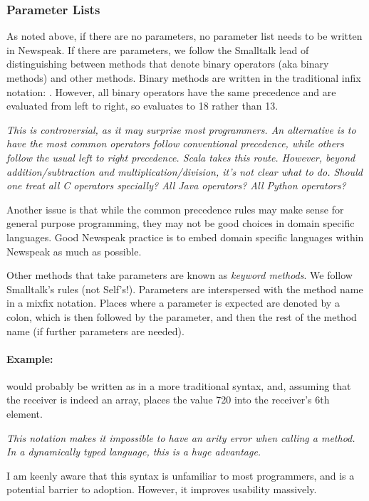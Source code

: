 \documentclass{article}
\begin{document}
\subsubsection{Parameter Lists}

As noted above, if there are no parameters, no parameter list needs to be written in Newspeak. If there are parameters, we follow the Smalltalk lead of distinguishing between methods that denote binary operators (aka binary methods) and other methods. Binary methods are written in the traditional infix notation: .  However, all binary operators have the same precedence and are evaluated from left to right, so  evaluates to 18 rather than 13. 

{\em This is controversial, as it may surprise most programmers. An alternative is to have the most common operators follow conventional precedence, while others follow the usual left to right precedence. Scala \cite{ScalaBook} takes this route. However, beyond addition/subtraction and multiplication/division, it's not clear what to do. Should one treat all C operators specially? All Java operators? All Python operators? 

Another issue is that while the common precedence rules may make sense for general purpose programming, they may not be good choices in domain specific languages. Good Newspeak practice is to embed domain specific languages within Newspeak as much as possible.
}

Other methods that take parameters are known as {\em keyword methods}. We follow Smalltalk's rules (not Self's!). Parameters are interspersed with the method name in a mixfix notation. Places where a parameter is expected are denoted by a colon, which is then followed by the parameter, and then the rest of the method name (if further parameters are needed).

\paragraph{Example:} 

  would probably be written as   in a more traditional syntax, and, assuming that the receiver is indeed an array, places the value 720 into the receiver's 6th element.



{\em
This notation makes it impossible to have an arity error when calling a method. In a dynamically typed language, this is a huge advantage. 

I am keenly aware that this syntax is unfamiliar to most programmers, and is a potential barrier to adoption. However, it improves usability massively. 
}
\end{document}
